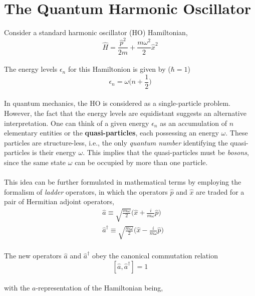 \documentclass{article}
\begin{document}
\section{The Quantum Harmonic Oscillator}
Consider a standard harmonic oscillator (HO) Hamiltonian,
\\
\begin{equation}
\hat{H} = \frac{\hat{p}^2}{2m} + \frac{m \omega^2}{2}\hat{x}^2
\end{equation}
\\
The energy levels $\epsilon_n$ for this Hamiltonion is given by ($\hbar = 1$)
\\
\begin{equation}
\epsilon_n = \omega\Big(n + \frac{1}{2}\Big)
\end{equation}
\\
In quantum mechanics, the HO is considered as a single-particle problem. However, the fact that the energy levels are equidistant suggests an alternative interpretation. One can think of a given energy $\epsilon_n$ as an accumulation of $n$ elementary entities or the \textbf{quasi-particles}, each possessing an energy $\omega$. These particles are structure-less, i.e., the only \textit{quantum number} identifying the quasi-particles is their energy $\omega$. This implies that the quasi-particles must be \textit{bosons}, since the same state $\omega$ can be occupied by more than one particle.
\\\\
This idea can be further formulated in mathematical terms by employing the formalism of \textit{ladder} operators, in which the operators $\hat{p}$ and $\hat{x}$ are traded for a pair of Hermitian adjoint operators, 
\\
\begin{equation}
\begin{split}
&\hat{a} \equiv  \sqrt{\frac{m \omega}{2}}\Big(\hat{x} + \frac{i}{m \omega} \hat{p}\Big)\\
&\hat{a}^\dagger \equiv  \sqrt{\frac{m \omega}{2}}\Big(\hat{x} - \frac{i}{m \omega} \hat{p}\Big)
\end{split}
\end{equation}
\\
The new operators $\hat{a}$ and $\hat{a}^\dagger$ obey the canonical commutation relation 
\begin{equation}\label{eq:1}
[\hat{a},\hat{a}^\dagger] = 1
\end{equation}
\\
with the $a$-representation of the Hamiltonian being,
\end{document}
